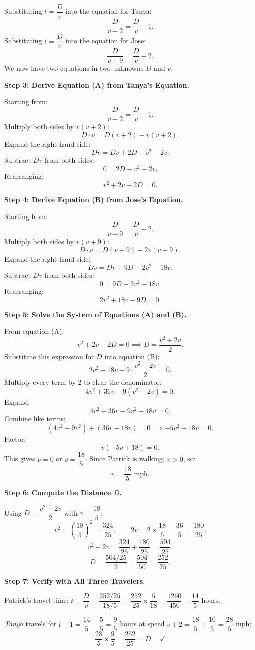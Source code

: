 \documentclass{llmxive}
\begin{document}
\begin{tcolorbox}[title=The early training stage model (scaled):, breakable]
Substituting $t = \dfrac{D}{v}$ into the equation for Tanya:
\[
\frac{D}{v+2} = \frac{D}{v} - 1.
\]
Substituting $t = \dfrac{D}{v}$ into the equation for Jose:
\[
\frac{D}{v+9} = \frac{D}{v} - 2.
\]
We now have two equations in two unknowns $D$ and $v$.

\medskip
\textbf{Step 3: Derive Equation (A) from Tanya's Equation.}

Starting from:
\[
\frac{D}{v+2} = \frac{D}{v} - 1.
\]
Multiply both sides by $v(v+2)$:
\[
D \cdot v = D(v+2) - v(v+2).
\]
Expand the right-hand side:
\[
Dv = Dv + 2D - v^2 - 2v.
\]
Subtract $Dv$ from both sides:
\[
0 = 2D - v^2 - 2v.
\]
Rearranging:
\[
v^2 + 2v - 2D = 0. \tag{A}
\]

\medskip
\textbf{Step 4: Derive Equation (B) from Jose's Equation.}

Starting from:
\[
\frac{D}{v+9} = \frac{D}{v} - 2.
\]
Multiply both sides by $v(v+9)$:
\[
D \cdot v = D(v+9) - 2v(v+9).
\]
Expand the right-hand side:
\[
Dv = Dv + 9D - 2v^2 - 18v.
\]
Subtract $Dv$ from both sides:
\[
0 = 9D - 2v^2 - 18v.
\]
Rearranging:
\[
2v^2 + 18v - 9D = 0. \tag{B}
\]

\medskip
\textbf{Step 5: Solve the System of Equations (A) and (B).}

From equation (A):
\[
v^2 + 2v - 2D = 0 \implies D = \frac{v^2 + 2v}{2}.
\]
Substitute this expression for $D$ into equation (B):
\[
2v^2 + 18v - 9 \cdot \frac{v^2+2v}{2} = 0.
\]
Multiply every term by 2 to clear the denominator:
\[
4v^2 + 36v - 9(v^2+2v) = 0.
\]
Expand:
\[
4v^2 + 36v - 9v^2 - 18v = 0.
\]
Combine like terms:
\[
(4v^2 - 9v^2) + (36v - 18v) = 0 \implies -5v^2 + 18v = 0.
\]
Factor:
\[
v(-5v + 18) = 0.
\]
This gives $v = 0$ or $v = \dfrac{18}{5}$. Since Patrick is walking, $v > 0$,
so:
\[
v = \frac{18}{5} \text{ mph}.
\]

\medskip
\textbf{Step 6: Compute the Distance $D$.}

Using $D = \dfrac{v^2+2v}{2}$ with $v = \dfrac{18}{5}$:
\[
v^2 = \left(\frac{18}{5}\right)^2 = \frac{324}{25},
\qquad
2v = 2 \times \frac{18}{5} = \frac{36}{5} = \frac{180}{25}.
\]
\[
v^2 + 2v = \frac{324}{25} + \frac{180}{25} = \frac{504}{25}.
\]
\[
D = \frac{504/25}{2} = \frac{504}{50} = \frac{252}{25}.
\]

\medskip
\textbf{Step 7: Verify with All Three Travelers.}

Patrick's travel time: $t = \dfrac{D}{v} = \dfrac{252/25}{18/5}
= \dfrac{252}{25} \times \dfrac{5}{18} = \dfrac{1260}{450} = \dfrac{14}{5}$
hours.

\medskip
\textit{Tanya} travels for $t - 1 = \dfrac{14}{5} - \dfrac{5}{5} = \dfrac{9}{5}$
hours at speed $v+2 = \dfrac{18}{5}+\dfrac{10}{5} = \dfrac{28}{5}$ mph:
\[
\frac{28}{5} \times \frac{9}{5} = \frac{252}{25} = D. \quad \checkmark
\]


\end{tcolorbox}
\end{document}
